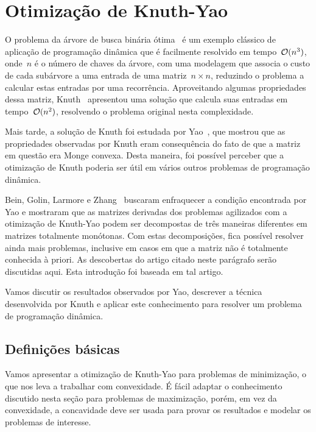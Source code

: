 \section{Otimização de Knuth-Yao}
\label{KY}


O problema da árvore de busca binária ótima~\cite{CLRS} é um exemplo clássico de aplicação de programação dinâmica que é facilmente resolvido em tempo~$\mathcal{O}(n^3)$, onde~$n$ é o número de chaves da árvore, com uma modelagem que associa o custo de cada subárvore a uma entrada de uma matriz~${ n \times n }$, reduzindo o problema a calcular estas entradas por uma recorrência. Aproveitando algumas propriedades dessa matriz, Knuth~\cite{Knuth:1971} apresentou uma solução que calcula suas entradas em tempo~$\mathcal{O}(n^2)$, resolvendo o problema original nesta complexidade.

Mais tarde, a solução de Knuth foi estudada por Yao~\cite{Yao:1980,Yao:1982}, que mostrou que as propriedades observadas por Knuth eram consequência do fato de que a matriz em questão era Monge convexa. Desta maneira, foi possível perceber que a otimização de Knuth poderia ser útil em vários outros problemas de programação dinâmica. 

Bein, Golin, Larmore e Zhang~\cite{Bein:2009} buscaram enfraquecer a condição encontrada por Yao e mostraram que as matrizes derivadas dos problemas agilizados com a otimização de Knuth-Yao podem ser decompostas de três maneiras diferentes em matrizes totalmente monótonas. Com estas decomposições, fica possível resolver ainda mais problemas, inclusive em casos em que a matriz não é totalmente conhecida à priori. As descobertas do artigo citado neste parágrafo serão discutidas aqui. Esta introdução foi baseada em tal artigo.

Vamos discutir os resultados observados por Yao, descrever a técnica desenvolvida por Knuth e aplicar este conhecimento para resolver um problema de programação dinâmica.


\subsection{Definições básicas} \label{KY:defs}

Vamos apresentar a otimização de Knuth-Yao para problemas de minimização, o que nos leva a trabalhar com convexidade. É fácil adaptar o conhecimento discutido nesta seção para problemas de maximização, porém, em vez da convexidade, a concavidade deve ser usada para provar os resultados e modelar os problemas de interesse.

